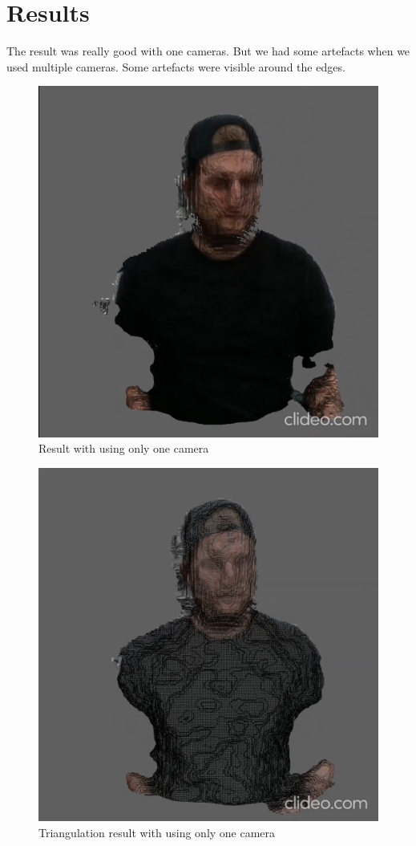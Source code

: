 \documentclass[10pt,twocolumn,letterpaper]{article}
\begin{document}
\section{Results}
The result was really good with one cameras. But we had some artefacts when we used multiple cameras. Some artefacts were visible around the edges.

\begin{figure}[t]
\begin{center}
\includegraphics[width=0.65\linewidth]{imgs/res1}
\end{center}
 \caption{Result with using only one camera}
\end{figure}

\begin{figure}[t]
\begin{center}
\includegraphics[width=0.65\linewidth]{imgs/res2}
\end{center}
 \caption{Triangulation result with using only one camera}
\end{figure}
\end{document}
